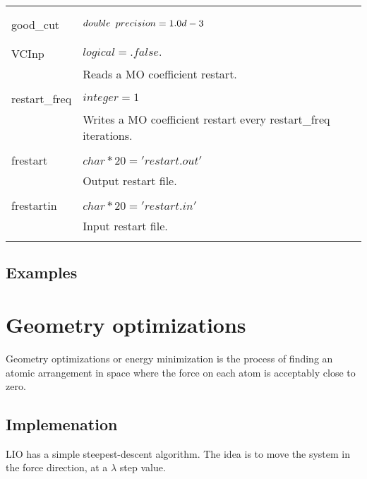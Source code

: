 \begin{table}
\begin{center}
\begin{tabular}{l l}
           & \\
           \\
           good\_cut & $ double \hspace{0.5em} precision = 1.0d-3 $\\
           & \\
           \\
           VCInp & $ logical = .false. $ \\
           & Reads a MO coefficient restart.\\
           \\
           restart\_freq & $ integer = 1 $ \\
           & Writes a MO coefficient restart every restart\_freq iterations.\\
           \\
           frestart & $ char*20 = 'restart.out' $ \\
           & Output restart file. \\
           \\
           frestartin & $ char*20 = 'restart.in' $ \\
           & Input restart file. \\
           \\
           \bottomrule
         \end{tabular}
         \end{center}
        \label{lio.fileio.var}
    \end{table}

    \subsection{Examples}




\section{Geometry optimizations}

Geometry optimizations or energy minimization is the process of finding an atomic arrangement in space where the force on each atom is acceptably close to zero.

    \subsection{Implemenation}
    
    LIO has a simple steepest-descent algorithm. The idea is to move the system in the force direction, at a $\lambda$ step value.
    
